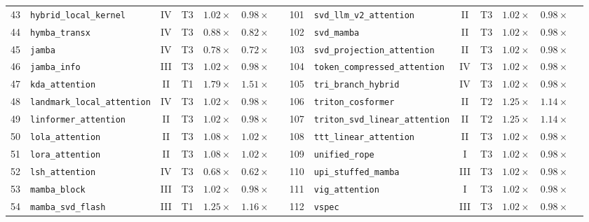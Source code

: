 \begin{table}[p]
{\begin{tabular}{r l c c c c l | r l c c c c l}
43 & \texttt{hybrid\_local\_kernel} & IV & T3 & $1.02\times$ & $0.98\times$ & \passslow{} & 101 & \texttt{svd\_llm\_v2\_attention} & II & T3 & $1.02\times$ & $0.98\times$ & \passslow{} \\
44 & \texttt{hymba\_transx} & IV & T3 & $0.88\times$ & $0.82\times$ & \passslow{} & 102 & \texttt{svd\_mamba} & II & T3 & $1.02\times$ & $0.98\times$ & \passslow{} \\
45 & \texttt{jamba} & IV & T3 & $0.78\times$ & $0.72\times$ & \passslow{} & 103 & \texttt{svd\_projection\_attention} & II & T3 & $1.02\times$ & $0.98\times$ & \passslow{} \\
46 & \texttt{jamba\_info} & III & T3 & $1.02\times$ & $0.98\times$ & \passslow{} & 104 & \texttt{token\_compressed\_attention} & IV & T3 & $1.02\times$ & $0.98\times$ & \passslow{} \\
47 & \texttt{kda\_attention} & II & T1 & $1.79\times$ & $1.51\times$ & \passfast{} & 105 & \texttt{tri\_branch\_hybrid} & IV & T3 & $1.02\times$ & $0.98\times$ & \passslow{} \\
48 & \texttt{landmark\_local\_attention} & IV & T3 & $1.02\times$ & $0.98\times$ & \passslow{} & 106 & \texttt{triton\_cosformer} & II & T2 & $1.25\times$ & $1.14\times$ & \passfast{} \\
49 & \texttt{linformer\_attention} & II & T3 & $1.02\times$ & $0.98\times$ & \passslow{} & 107 & \texttt{triton\_svd\_linear\_attention} & II & T2 & $1.25\times$ & $1.14\times$ & \passfast{} \\
50 & \texttt{lola\_attention} & II & T3 & $1.08\times$ & $1.02\times$ & \passfast{} & 108 & \texttt{ttt\_linear\_attention} & II & T3 & $1.02\times$ & $0.98\times$ & \passslow{} \\
51 & \texttt{lora\_attention} & II & T3 & $1.08\times$ & $1.02\times$ & \passfast{} & 109 & \texttt{unified\_rope} & I & T3 & $1.02\times$ & $0.98\times$ & \passslow{} \\
52 & \texttt{lsh\_attention} & IV & T3 & $0.68\times$ & $0.62\times$ & \passslow{} & 110 & \texttt{upi\_stuffed\_mamba} & III & T3 & $1.02\times$ & $0.98\times$ & \passslow{} \\
53 & \texttt{mamba\_block} & III & T3 & $1.02\times$ & $0.98\times$ & \passslow{} & 111 & \texttt{vig\_attention} & I & T3 & $1.02\times$ & $0.98\times$ & \passslow{} \\
54 & \texttt{mamba\_svd\_flash} & III & T1 & $1.25\times$ & $1.16\times$ & \passfast{} & 112 & \texttt{vspec} & III & T3 & $1.02\times$ & $0.98\times$ & \passslow{} \\

\end{tabular}}
\end{table}
